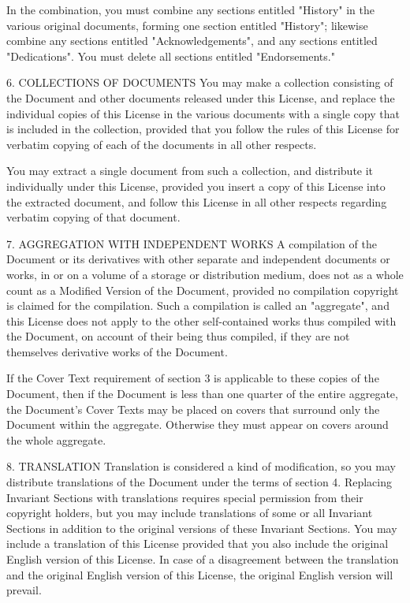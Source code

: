 In the combination, you must combine any sections entitled "History" in the various original documents, forming one section entitled "History"; likewise combine any sections entitled "Acknowledgements", and any sections entitled "Dedications". You must delete all sections entitled "Endorsements."

6. COLLECTIONS OF DOCUMENTS
You may make a collection consisting of the Document and other documents released under this License, and replace the individual copies of this License in the various documents with a single copy that is included in the collection, provided that you follow the rules of this License for verbatim copying of each of the documents in all other respects.

You may extract a single document from such a collection, and distribute it individually under this License, provided you insert a copy of this License into the extracted document, and follow this License in all other respects regarding verbatim copying of that document.

7. AGGREGATION WITH INDEPENDENT WORKS
A compilation of the Document or its derivatives with other separate and independent documents or works, in or on a volume of a storage or distribution medium, does not as a whole count as a Modified Version of the Document, provided no compilation copyright is claimed for the compilation. Such a compilation is called an "aggregate", and this License does not apply to the other self-contained works thus compiled with the Document, on account of their being thus compiled, if they are not themselves derivative works of the Document.

If the Cover Text requirement of section 3 is applicable to these copies of the Document, then if the Document is less than one quarter of the entire aggregate, the Document's Cover Texts may be placed on covers that surround only the Document within the aggregate. Otherwise they must appear on covers around the whole aggregate.

8. TRANSLATION
Translation is considered a kind of modification, so you may distribute translations of the Document under the terms of section 4. Replacing Invariant Sections with translations requires special permission from their copyright holders, but you may include translations of some or all Invariant Sections in addition to the original versions of these Invariant Sections. You may include a translation of this License provided that you also include the original English version of this License. In case of a disagreement between the translation and the original English version of this License, the original English version will prevail.


